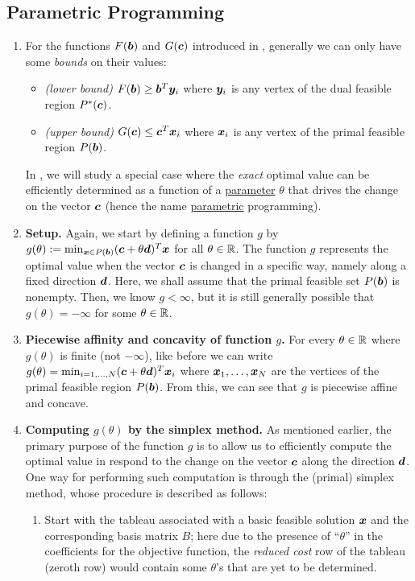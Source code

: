 \subsection{Parametric Programming}
\label{subsect:para-programming}
\begin{enumerate}
\item For the functions \(F(\bm{b})\) and \(G(\bm{c})\) introduced in
, generally we can only have some \emph{bounds} on
their values:
\begin{itemize}
\item \emph{(lower bound)} \(F(\bm{b})\ge \bm{b}^{T}\bm{y}_i\) where
\(\bm{y}_i\) is any vertex of the dual feasible region \(P^*(\bm{c})\).
\item \emph{(upper bound)} \(G(\bm{c})\le \bm{c}^{T}\bm{x}_i\) where
\(\bm{x}_i\) is any vertex of the primal feasible region \(P(\bm{b})\).
\end{itemize}
In , we will study a special case where the
\emph{exact} optimal value can be efficiently determined as a function of a
\underline{parameter} \(\theta\) that drives the change on the vector
\(\bm{c}\) (hence the name \underline{parametric} programming).

\item \textbf{Setup.} Again, we start by defining a function \(g\) by
\(g(\theta):=\min_{\bm{x}\in
P(\bm{b})}(\bm{c}+\theta\bm{d})^{T}\bm{x}\) for all \(\theta\in\mathbb{R}\).
The function \(g\) represents the optimal value when the vector \(\bm{c}\) is
changed in a specific way, namely along a fixed direction \(\bm{d}\).  Here,
we shall assume that the primal feasible set \(P(\bm{b})\) is nonempty. Then,
we know \(g<\infty\), but it is still generally possible that
\(g(\theta)=-\infty\) for some \(\theta\in\mathbb{R}\).

\item \label{it:para-g-piecewise-affine-concave} \textbf{Piecewise affinity and
concavity of function \(g\).} For every \(\theta\in\mathbb{R}\) where \(g(\theta)\) is
finite (not \(-\infty\)), like before we can write
\(g(\theta)=\min_{i=1,\dotsc,N}(\bm{c}+\theta\bm{d})^{T}\bm{x}_i\) where
\(\bm{x}_1,\dotsc,\bm{x}_N\) are the vertices of the primal feasible region
\(P(\bm{b})\). From this, we can see that \(g\) is piecewise affine and
concave.
\item \label{it:cpt-g-proc} \textbf{Computing \(g(\theta)\) by the simplex
method.} As mentioned earlier, the primary purpose of the function \(g\) is to
allow us to efficiently compute the optimal value in respond to the change on
the vector \(\bm{c}\) along the direction \(\bm{d}\). One way for
performing such computation is through the (primal) simplex method, whose procedure is
described as follows:
\begin{enumerate}[label={(\arabic*)}]
\item Start with the tableau associated with a basic feasible solution
\(\bm{x}\) and the corresponding basis matrix \(B\); here due to the presence
of ``\(\theta\)'' in the coefficients for the objective function, the
\emph{reduced cost} row of the tableau (zeroth row) would contain some
\(\theta\)'s that are yet to be determined.


\end{enumerate}
\end{enumerate}
